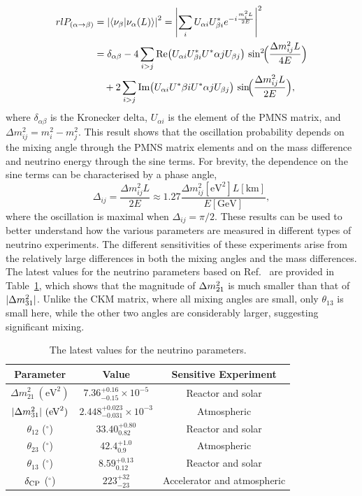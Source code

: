 \begin{eqnarray}{rl}
  P_{(\alpha \to \beta)} &= \left|\braket{\nu_\beta | \nu_\alpha(L)} \right|^2 = \left| \sum_i U_{\alpha i} U^*_{\beta i} e^{-i \frac{m_i^2 L}{2E}} \right|^2 \\
  &= \delta_{\alpha\beta} - 4 \sum_{i>j} \text{Re} \bigl( U_{\alpha i} U^*_{\beta i} U^*{\alpha j} U_{\beta j} \bigr) \,\sin^2 \!\Bigl( \frac{\Delta m^2_{ij} L}{4E} \Bigr) \\
  &\quad + 2 \sum_{i>j} \text{Im} \bigl( U_{\alpha i} U^*{\beta i} U^*{\alpha j} U_{\beta j} \bigr) \,\sin \!\Bigl( \frac{\Delta m^2_{ij} L}{2E} \Bigr),
\end{eqnarray}
where $\delta_{\alpha\beta}$ is the Kronecker delta, $U_{\alpha i}$ is the element of the PMNS matrix, and $\Delta m^2_{ij} = m_i^2 - m_j^2$.
This result shows that the oscillation probability depends on the mixing angle through the PMNS matrix elements and on the mass difference and neutrino energy through the sine terms.
For brevity, the dependence on the sine terms can be characterised by a phase angle,
\begin{equation}
  \label{eq:osc-phase}
  \Delta_{ij} = \frac{\Delta m^2_{ij} L}{2E} \approx 1.27 \frac{\Delta m^2_{ij} [\text{eV}^2] L [\text{km}]}{E [\text{GeV}]},
\end{equation}
where the oscillation is maximal when $\Delta_{ij} = \pi / 2$.
These results can be used to better understand how the various parameters are measured in different types of neutrino experiments.
The different sensitivities of these experiments arise from the relatively large differences in both the mixing angles and the mass differences.
The latest values for the neutrino parameters based on Ref.~\cite{Capozzi:2021fjo,ParticleDataGroup:2024cfk} are provided in Table~\ref{tab:neutrino-parameters}, which shows that the magnitude of $\Delta m^2_{21}$ is much smaller than that of $|\Delta m^2_{31}|$.
Unlike the CKM matrix, where all mixing angles are small, only $\theta_{13}$ is small here, while the other two angles are considerably larger, suggesting significant mixing.

\begin{table}[h]
  \centering
  \begin{tabular}{c|c|c}
    Parameter & Value & Sensitive Experiment\\
    \hline
    \hline
    $\Delta m^2_{21}~(\text{eV}^2)$ & $7.36^{+0.16}_{-0.15} \times 10^{-5}$ & Reactor and solar \\
    $|\Delta m^2_{31}|~(\textrm{eV}^2)$ & $2.448^{+0.023}_{-0.031} \times 10^{-3}$ & Atmospheric \\
    $\theta_{12}$ ($^\circ$) & $33.40^{+0.80}_{0.82}$ & Reactor and solar \\
    $\theta_{23}$ ($^\circ$)       & $42.4^{+1.0}_{0.9}$ & Atmospheric\\
    $\theta_{13}$ ($^\circ$)       & $8.59^{+0.13}_{0.12}$ & Reactor and solar \\
    $\delta_\textrm{CP}$ ($^\circ$) & $223^{+32}_{-23}$   & Accelerator and atmospheric \\
    \hline
  \end{tabular}
  \caption{The latest values for the neutrino parameters.}
  \label{tab:neutrino-parameters}
\end{table}

